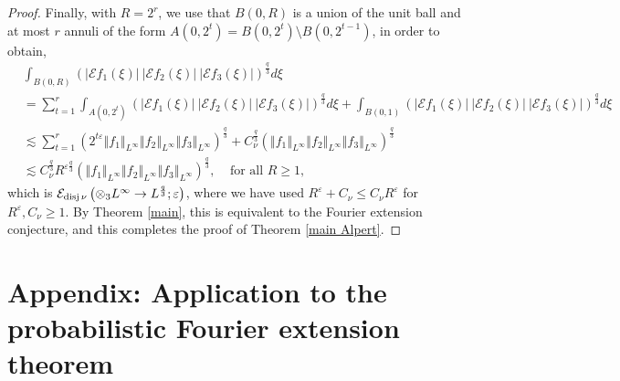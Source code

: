 \documentclass{amsart}%
\theoremstyle{plain}
\numberwithin{equation}{section}
\begin{document}
\begin{proof}
Finally, with $R=2^{r}$, we use that $B\left(  0,R\right)  $ is a union of the
unit ball and at most $r$ annuli of the form $A\left(  0,2^{t}\right)
=B\left(  0,2^{t}\right)  \setminus B\left(  0,2^{t-1}\right)  $, in order to
obtain,%
\begin{align*}
&  \int_{B\left(  0,R\right)  }\left(  \left\vert \mathcal{E}f_{1}\left(
\xi\right)  \right\vert \ \left\vert \mathcal{E}f_{2}\left(  \xi\right)
\right\vert \ \left\vert \mathcal{E}f_{3}\left(  \xi\right)  \right\vert
\right)  ^{\frac{q}{3}}d\xi\\
&  =\sum_{t=1}^{r}\int_{A\left(  0,2^{t}\right)  }\left(  \left\vert
\mathcal{E}f_{1}\left(  \xi\right)  \right\vert \ \left\vert \mathcal{E}%
f_{2}\left(  \xi\right)  \right\vert \ \left\vert \mathcal{E}f_{3}\left(
\xi\right)  \right\vert \right)  ^{\frac{q}{3}}d\xi+\int_{B\left(  0,1\right)
}\left(  \left\vert \mathcal{E}f_{1}\left(  \xi\right)  \right\vert
\ \left\vert \mathcal{E}f_{2}\left(  \xi\right)  \right\vert \ \left\vert
\mathcal{E}f_{3}\left(  \xi\right)  \right\vert \right)  ^{\frac{q}{3}}d\xi\\
&  \lesssim\sum_{t=1}^{r}\left(  2^{t\varepsilon}\left\Vert f_{1}\right\Vert
_{L^{\infty}}\left\Vert f_{2}\right\Vert _{L^{\infty}}\left\Vert
f_{3}\right\Vert _{L^{\infty}}\right)  ^{\frac{q}{3}}+C_{\nu}^{\frac{q}{3}%
}\left(  \left\Vert f_{1}\right\Vert _{L^{\infty}}\left\Vert f_{2}\right\Vert
_{L^{\infty}}\left\Vert f_{3}\right\Vert _{L^{\infty}}\right)  ^{\frac{q}{3}%
}\\
&  \lesssim C_{\nu}^{\frac{q}{3}}R^{\varepsilon\frac{q}{3}}\left(  \left\Vert
f_{1}\right\Vert _{L^{\infty}}\left\Vert f_{2}\right\Vert _{L^{\infty}%
}\left\Vert f_{3}\right\Vert _{L^{\infty}}\right)  ^{\frac{q}{3}%
},\ \ \ \ \ \text{for all }R\geq1,
\end{align*}
which is $\mathcal{E}_{\mathop{\rm disj}\nu}\left(  \otimes_{3}L^{\infty
}\rightarrow L^{\frac{q}{3}};\varepsilon\right)  $, where we have used
$R^{\varepsilon}+C_{\nu}\leq C_{\nu}R^{\varepsilon}$ for $R^{\varepsilon
},C_{\nu}\geq1$. By Theorem \ref{main}, this is equivalent to the Fourier
extension conjecture, and this completes the proof of Theorem
\ref{main Alpert}.
\end{proof}

\section{Appendix: Application to the probabilistic Fourier extension theorem}
\end{document}
